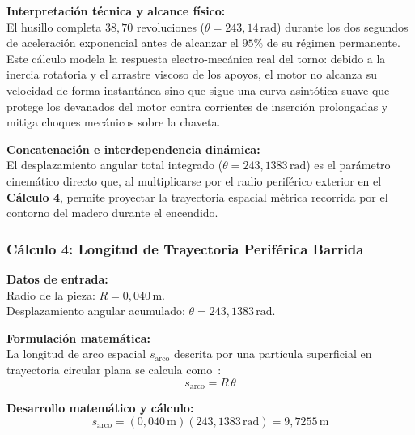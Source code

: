 \documentclass[12pt,a4paper]{article}
\begin{document}
\noindent\textbf{Interpretación técnica y alcance físico:}\\
El husillo completa $38{,}70$ revoluciones ($\theta = 243{,}14\,\text{rad}$) durante los dos segundos de aceleración exponencial antes de alcanzar el $95\%$ de su régimen permanente. Este cálculo modela la respuesta electro-mecánica real del torno: debido a la inercia rotatoria y el arrastre viscoso de los apoyos, el motor no alcanza su velocidad de forma instantánea sino que sigue una curva asintótica suave que protege los devanados del motor contra corrientes de inserción prolongadas y mitiga choques mecánicos sobre la chaveta.

\noindent\textbf{Concatenación e interdependencia dinámica:}\\
El desplazamiento angular total integrado ($\theta = 243{,}1383\,\text{rad}$) es el parámetro cinemático directo que, al multiplicarse por el radio periférico exterior en el \textbf{Cálculo 4}, permite proyectar la trayectoria espacial métrica recorrida por el contorno del madero durante el encendido.
\vspace{12pt}

\subsubsection{Cálculo 4: Longitud de Trayectoria Periférica Barrida}

\noindent\textbf{Datos de entrada:}\\
Radio de la pieza: $R = 0{,}040\,\text{m}$.\\
Desplazamiento angular acumulado: $\theta = 243{,}1383\,\text{rad}$.
\vspace{6pt}

\noindent\textbf{Formulación matemática:}\\
La longitud de arco espacial $s_{\text{arco}}$ descrita por una partícula superficial en trayectoria circular plana se calcula como~\cite{meriam2015}:
\begin{equation}
    s_{\text{arco}} = R\,\theta
\end{equation}
\vspace{6pt}

\noindent\textbf{Desarrollo matemático y cálculo:}
\begin{equation}
    s_{\text{arco}} = (0{,}040\,\text{m})(243{,}1383\,\text{rad}) = \boxed{9{,}7255\,\text{m}}
\end{equation}
\vspace{6pt}
\end{document}
